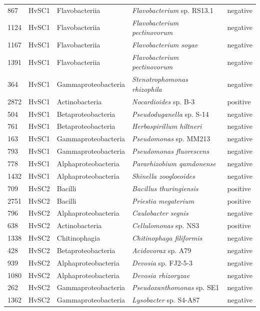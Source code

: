 \begin{longtable}{lllll}
		867 & HvSC1 & Flavobacteriia & \textit{Flavobacterium} sp. RS13.1 & negative \\
		1124 & HvSC1 & Flavobacteriia & \textit{Flavobacterium pectinovorum} & negative \\
		1167 & HvSC1 & Flavobacteriia & \textit{Flavobacterium soyae} & negative \\
		1391 & HvSC1 & Flavobacteriia & \textit{Flavobacterium pectinovorum} & negative \\
		364 & HvSC1 & Gammaproteobacteria & \textit{Stenotrophomonas rhizophila} & negative \\
		2872 & HvSC1 & Actinobacteria & \textit{Nocardioides} sp. B-3 & positive \\
		504 & HvSC1 & Betaproteobacteria & \textit{Pseudoduganella} sp. S-14 & negative \\
		761 & HvSC1 & Betaproteobacteria & \textit{Herbaspirillum hiltneri} & negative \\
		163 & HvSC1 & Gammaproteobacteria & \textit{Pseudomonas} sp. MM213 & negative \\
		793 & HvSC1 & Gammaproteobacteria & \textit{Pseudomonas fluorescens} & negative \\
		778 & HvSC1 & Alphaproteobacteria & \textit{Pararhizobium qamdonense} & negative \\
		1432 & HvSC1 & Alphaproteobacteria & \textit{Shinella zoogloeoides} & negative \\
		709 & HvSC2 & Bacilli & \textit{Bacillus thuringiensis} & positive \\
		2751 & HvSC2 & Bacilli & \textit{Priestia megaterium} & positive \\
		796 & HvSC2 & Alphaproteobacteria & \textit{Caulobacter segnis} & negative \\
		638 & HvSC2 & Actinobacteria & \textit{Cellulomonas} sp. NS3 & positive \\
		1338 & HvSC2 & Chitinophagia & \textit{Chitinophaga filiformis} & negative \\
		428 & HvSC2 & Betaproteobacteria & \textit{Acidovorax} sp. A79 & negative \\
		939 & HvSC2 & Alphaproteobacteria & \textit{Devosia} sp. FJ2-5-3 & negative \\
		1080 & HvSC2 & Alphaproteobacteria & \textit{Devosia rhizoryzae} & negative \\
		262 & HvSC2 & Gammaproteobacteria & \textit{Pseudoxanthomonas} sp. SE1 & negative \\
		1362 & HvSC2 & Gammaproteobacteria & \textit{Lysobacter} sp. S4-A87 & negative \\

\end{longtable}
